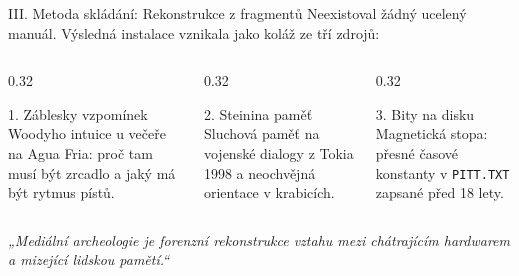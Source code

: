 \documentclass[aspectratio=169,11pt]{beamer}
\begin{document}
\begin{frame}{III. Metoda skládání: Rekonstrukce z fragmentů}
  Neexistoval žádný ucelený manuál. Výsledná instalace vznikala jako koláž ze tří zdrojů:
  \vspace{0.3cm}
  \begin{columns}
    \begin{column}{0.32\textwidth}
      \begin{block}{1. Záblesky vzpomínek}
        Woodyho intuice u večeře na Agua Fria: proč tam musí být zrcadlo a jaký má být rytmus pístů.
      \end{block}
    \end{column}
    \begin{column}{0.32\textwidth}
      \begin{block}{2. Steinina paměť}
        Sluchová paměť na vojenské dialogy z Tokia 1998 a neochvějná orientace v krabicích.
      \end{block}
    \end{column}
    \begin{column}{0.32\textwidth}
      \begin{block}{3. Bity na disku}
        Magnetická stopa: přesné časové konstanty v \texttt{PITT.TXT} zapsané před 18 lety.
      \end{block}
    \end{column}
  \end{columns}
  \vspace{0.4cm}
  \centering\textit{„Mediální archeologie je forenzní rekonstrukce vztahu mezi chátrajícím hardwarem a mizející lidskou pamětí.“}
\end{frame}
\end{document}
